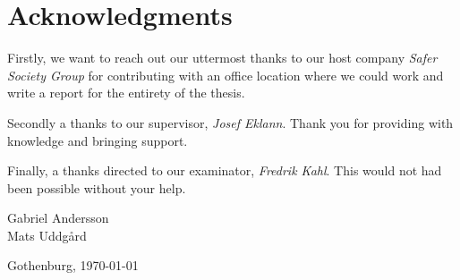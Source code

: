 \thispagestyle{plain}			%
\section*{Acknowledgments}
Firstly, we want to reach out our uttermost thanks to our host company \emph{Safer Society Group} for contributing with an office location where we could work and write a report for the entirety of the thesis. 

Secondly a thanks to our supervisor, \emph{Josef Eklann}. Thank you for providing with knowledge and bringing support. 

Finally, a thanks directed to our examinator, \emph{Fredrik Kahl}. This would not had been possible without your help.

\vspace{1cm}
\begin{flushright}
Gabriel Andersson \\
Mats Uddgård

\vspace{1cm}

Gothenburg, \today
\end{flushright}

\thispagestyle{empty}
\mbox{}